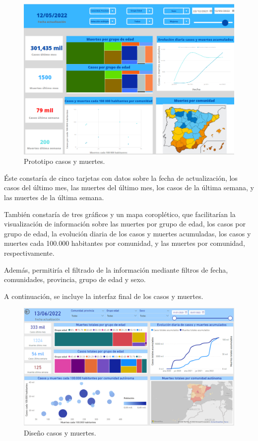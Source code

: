\begin{figure}[h]
    \advance\leftskip-1cm 
    \includegraphics[scale=0.7]{img/prototipo_casosYmuertes.PNG}
    \caption{Prototipo casos y muertes.}
\end{figure}

Éste constaría de cinco tarjetas con datos sobre la fecha de actualización, los casos del último mes, las muertes del último mes, los casos de la última semana, y las muertes de la última semana. 

También constaría de tres gráficos y un mapa coroplético, que facilitarían la visualización de información sobre las muertes por grupo de edad, los casos por grupo de edad, la evolución diaria de los casos y muertes acumuladas, los casos y muertes cada 100.000 habitantes por comunidad, y las muertes por comunidad, respectivamente.

Además, permitiría el filtrado de la información mediante filtros de fecha, comunidades, provincia, grupo de edad y sexo.

\newpage 
A continuación, se incluye la interfaz final de los casos y muertes. 

\begin{figure}[h]
    \advance\leftskip-0.5cm 
    \includegraphics[scale=0.55]{img/powerBI_casosYmuertes.PNG}
    \caption{Diseño casos y muertes.}
\end{figure}

